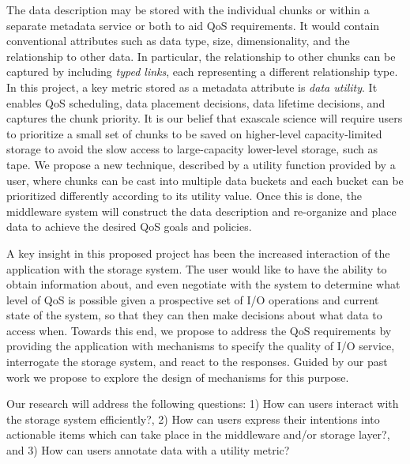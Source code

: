 The data description may be stored with the individual chunks or within a
separate metadata service or both to aid QoS requirements. It would contain
conventional attributes such as data type, size, dimensionality, and the
relationship to other data. In particular, the relationship to other chunks can
be captured by including \textit{typed links}, each representing a different
relationship type.  In this project, a key metric stored as a metadata
attribute is \textit{data utility}.  It enables QoS scheduling, data placement
decisions, data lifetime decisions, and captures the chunk priority. It is
our belief that exascale science will require users to prioritize a small set
of chunks to be saved on higher-level capacity-limited storage to avoid the
slow access to large-capacity lower-level storage, such as tape.  We propose a
new technique, described by a utility function provided by a user, where chunks
can be cast into multiple data buckets and each bucket can be prioritized
differently according to its utility value.  Once this is done, the middleware
system will construct the data description and re-organize and place data to
achieve the desired QoS goals and policies.

A key insight in this proposed project has been the increased interaction of
the application with the storage system.
The user would like to have the ability to obtain information about, and even
negotiate with the system to determine what
level of QoS is possible given
a prospective set of I/O operations and current state of the system, so that
they can then make decisions about what data to access when.
Towards this end, we propose to
address the QoS requirements by providing the application with mechanisms to
specify the quality of I/O service, interrogate the storage system, and react
to the responses. Guided by our past work we propose to explore the design of
mechanisms for this purpose. 

Our research will address the following questions:
1) How can users interact with the storage system efficiently?,
2) How can users express their intentions into actionable items which can take place in the middleware and/or storage layer?, and
3) How can users annotate data with a utility metric?


